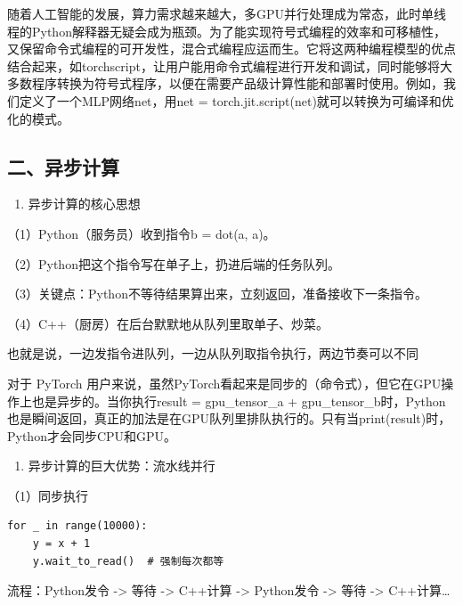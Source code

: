 随着人工智能的发展，算力需求越来越大，多GPU并行处理成为常态，此时单线程的Python解释器无疑会成为瓶颈。为了能实现符号式编程的效率和可移植性，又保留命令式编程的可开发性，混合式编程应运而生。它将这两种编程模型的优点结合起来，如torchscript，让用户能用命令式编程进行开发和调试，同时能够将大多数程序转换为符号式程序，以便在需要产品级计算性能和部署时使用。例如，我们定义了一个MLP网络net，用net = torch.jit.script(net)就可以转换为可编译和优化的模式。

\hypertarget{ux4e8cux5f02ux6b65ux8ba1ux7b97}{%
\subsection{二、异步计算}\label{ux4e8cux5f02ux6b65ux8ba1ux7b97}}

\begin{enumerate}
\def\labelenumi{\arabic{enumi}.}
\tightlist
\item
  异步计算的核心思想
\end{enumerate}

（1）Python（服务员）收到指令b = dot(a, a)。

（2）Python把这个指令写在单子上，扔进后端的任务队列。

（3）关键点：Python不等待结果算出来，立刻返回，准备接收下一条指令。

（4）C++（厨房）在后台默默地从队列里取单子、炒菜。

也就是说，一边发指令进队列，一边从队列取指令执行，两边节奏可以不同

对于 PyTorch 用户来说，虽然PyTorch看起来是同步的（命令式），但它在GPU操作上也是异步的。当你执行result = gpu\_tensor\_a + gpu\_tensor\_b时，Python也是瞬间返回，真正的加法是在GPU队列里排队执行的。只有当print(result)时，Python才会同步CPU和GPU。

\begin{enumerate}
\def\labelenumi{\arabic{enumi}.}
\setcounter{enumi}{1}
\tightlist
\item
  异步计算的巨大优势：流水线并行
\end{enumerate}

（1）同步执行

\begin{verbatim}
for _ in range(10000):
    y = x + 1
    y.wait_to_read()  # 强制每次都等
\end{verbatim}

流程：Python发令 -\textgreater{} 等待 -\textgreater{} C++计算 -\textgreater{} Python发令 -\textgreater{} 等待 -\textgreater{} C++计算\ldots{}

